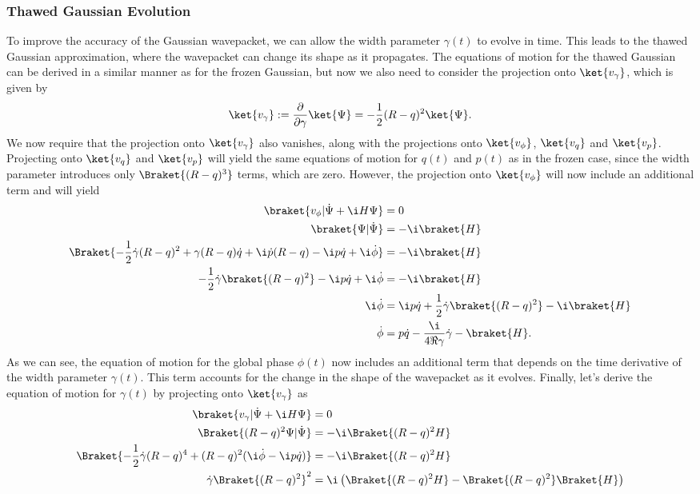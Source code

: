 \subsubsection{Thawed Gaussian Evolution}
To improve the accuracy of the Gaussian wavepacket, we can allow the width parameter $\gamma(t)$ to evolve in time. This leads to the thawed Gaussian approximation, where the wavepacket can change its shape as it propagates. The equations of motion for the thawed Gaussian can be derived in a similar manner as for the frozen Gaussian, but now we also need to consider the projection onto $\ket{v_\gamma}$, which is given by
\begin{equation}\label{eq:gaussian_derivative_gamma}
\ket{v_\gamma}:=\frac{\partial}{\partial \gamma}\ket{\Psi}=-\frac{1}{2}(R-q)^2\ket{\Psi}.
\end{equation}
We now require that the projection onto $\ket{v_\gamma}$ also vanishes, along with the projections onto $\ket{v_\phi}$, $\ket{v_q}$ and $\ket{v_p}$. Projecting onto $\ket{v_q}$ and $\ket{v_p}$ will yield the same equations of motion for $q(t)$ and $p(t)$ as in the frozen case, since the width parameter introduces only $\Braket{(R-q)^3}$ terms, which are zero. However, the projection onto $\ket{v_\phi}$ will now include an additional term and will yield
\begin{align}
\braket{v_\phi|\dot\Psi+\i H\Psi}&=0\\
\braket{\Psi|\dot\Psi}&=-\i\braket{H}\\
\Braket{-\frac{1}{2}\dot\gamma(R-q)^2+\gamma(R-q)\dot q+\i\dot p(R-q)-\i p\dot q+\i\dot\phi}&=-\i\braket{H}\\
-\frac{1}{2}\dot\gamma\braket{(R-q)^2}-\i p\dot q+\i\dot\phi&=-\i\braket{H}\\
\i\dot\phi&=\i p\dot q+\frac{1}{2}\dot\gamma\braket{(R-q)^2}-\i\braket{H}\\
\dot\phi&=p\dot q-\frac{\i}{4\Re\gamma}\dot\gamma-\braket{H}.
\end{align}
As we can see, the equation of motion for the global phase $\phi(t)$ now includes an additional term that depends on the time derivative of the width parameter $\gamma(t)$. This term accounts for the change in the shape of the wavepacket as it evolves. Finally, let's derive the equation of motion for $\gamma(t)$ by projecting onto $\ket{v_\gamma}$ as
\begin{align}
\braket{v_\gamma|\dot\Psi+\i H\Psi}&=0\\
\Braket{(R-q)^2\Psi|\dot\Psi}&=-\i\Braket{(R-q)^2H}\\
\Braket{-\frac{1}{2}\dot\gamma(R-q)^4+(R-q)^2(\i\dot\phi-\i p\dot q)}&=-\i\Braket{(R-q)^2H}\\
\dot\gamma\Braket{(R-q)^2}^2&=\i\left(\Braket{(R-q)^2H}-\Braket{(R-q)^2}\Braket{H}\right)
\end{align}
